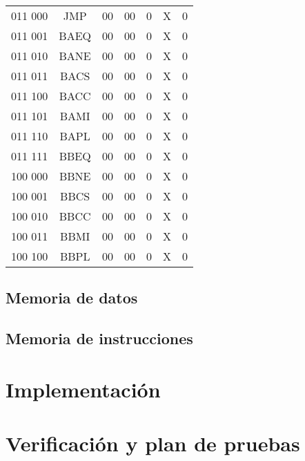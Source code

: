 \documentclass[paper=letter, fontsize=12pt]{article}
\begin{document}
\begin{table}[h]
\begin{tabular}{cc|ccccc}
011 000 	& JMP			& 00 	& 00    & 0     & X     & 0 \\
011 001 	& BAEQ			& 00 	& 00    & 0     & X     & 0 \\
011 010 	& BANE			& 00 	& 00    & 0     & X     & 0 \\
011 011 	& BACS			& 00 	& 00    & 0     & X     & 0 \\
011 100 	& BACC			& 00 	& 00    & 0     & X     & 0 \\
011 101 	& BAMI			& 00 	& 00    & 0     & X     & 0 \\
011 110 	& BAPL			& 00 	& 00    & 0     & X     & 0 \\
011 111 	& BBEQ			& 00 	& 00    & 0     & X     & 0 \\
100 000 	& BBNE			& 00 	& 00    & 0     & X     & 0 \\
100 001 	& BBCS			& 00 	& 00    & 0     & X     & 0 \\
100 010 	& BBCC			& 00 	& 00    & 0     & X     & 0 \\
100 011 	& BBMI			& 00 	& 00    & 0     & X     & 0 \\
100 100 	& BBPL			& 00 	& 00    & 0     & X     & 0 \\

\end{tabular}
\end{table}


\subsection{Memoria de datos}

\subsection{Memoria de instrucciones}

\section{Implementación}

\section{Verificación y plan de pruebas}
\end{document}
